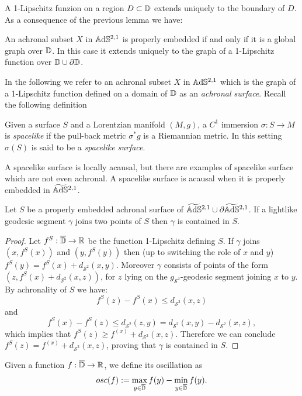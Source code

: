 A 1-Lipschitz funzion on a region $D \subset \mathbb{D}$ extends uniquely to the boundary of $D$. As a consequence of the previous lemma we have:\\
\begin{lemma}
    An achronal subset $X$ in $\mathbb{A}\mathrm{d}\mathbb{S}^{2,1}$ is properly embedded if and only if it is a global graph over $\mathbb{D}$. In this case it extends uniquely to the graph of a 1-Lipschitz function over $\mathbb{D} \cup \partial \mathbb{D}$.
\end{lemma}
In the following we refer to an achronal subset $X$ in $\mathbb{A}\mathrm{d}\mathbb{S}^{2,1}$ which is the graph of a 1-Lipschitz function defined on a domain of $\mathbb{D}$ as an \textit{achronal surface}. Recall the following definition
\begin{definition}
    Given a surface $S$ and a Lorentzian manifold $(M,g)$, a $C^1$ immersion $\sigma : S \to M$ is \textit{spacelike} if the pull-back metric $\sigma^* g$ is a Riemannian metric. In this setting $\sigma(S)$ is said to be a \textit{spacelike surface}.
\end{definition}
A spacelike surface is locally acausal, but there are examples of spacelike surface which are not even achronal. A spacelike surface is acausal when it is properly embedded in $\widetilde{\mathbb{A}\mathrm{d}\mathbb{S}}{}^{2,1}$. 
\begin{lemma}\label{lem:lightlike}
    Let $S$ be a properly embedded achronal surface of $\widetilde{\mathbb{A}\mathrm{d}\mathbb{S}}{}^{2,1} \cup \partial\widetilde{\mathbb{A}\mathrm{d}\mathbb{S}}{}^{2,1}$. If a lightlike geodesic segment $\gamma$ joins two points of $S$ then $\gamma$ is contained in $S$.
\end{lemma}
\begin{proof}
    Let $f^S:\overline{\mathbb{D}} \to \mathbb{R}$ be the function 1-Lipschitz defining $S$. If $\gamma$ joins $(x,f^S(x))$ and $(y,f^S(y))$ then (up to switching the role of $x$ and $y$) $f^S(y) = f^S(x) + d_{\mathcal{S}^2}(x,y)$. Moreover $\gamma$ consists of points of the form $(z,f^S(x) + d_{\mathcal{S}^2}(x,z))$, for $z$ lying on the $g_{\mathcal{S}^2}$-geodesic segment joining $x$ to $y$. By achronality of $S$ we have:
    \[
        f^S(z) - f^S(x) \leq d_{\mathcal{S}^2}(x,z)
    \]
    and 
    \[
        f^S(x) - f^S(z) \leq d_{\mathcal{S}^2}(z,y) = d_{\mathcal{S}^2}(x,y) - d_{\mathcal{S}^2}(x,z),
    \]
    which implies that $f^S(z) \geq f^(x) + d_{\mathcal{S}^2}(x,z)$. Therefore we can conclude $f^S(z) = f^(x) + d_{\mathcal{S}^2}(x,z)$, proving that $\gamma$ is contained in $S$.
\end{proof}
Given a function $f: \overline{\mathbb{D}}\to\mathbb{R}$, we define its oscillation as 
\[
    osc(f):= \max_{y\in\overline{\mathbb{D}}} f(y) - \min_{y\in\overline{\mathbb{D}}} f(y).
\]
